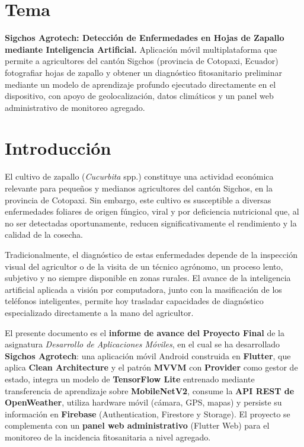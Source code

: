 \documentclass[12pt,a4paper]{article}
\begin{document}
\newpage
{}
\setcounter{page}{1}

\section*{Tema}

\textbf{Sigchos Agrotech: Detección de Enfermedades en Hojas de Zapallo mediante
Inteligencia Artificial.} Aplicación móvil multiplataforma que permite a
agricultores del cantón Sigchos (provincia de Cotopaxi, Ecuador) fotografiar
hojas de zapallo y obtener un diagnóstico fitosanitario preliminar mediante un
modelo de aprendizaje profundo ejecutado directamente en el dispositivo, con
apoyo de geolocalización, datos climáticos y un panel web administrativo de
monitoreo agregado.

\section{Introducción}

El cultivo de zapallo (\textit{Cucurbita} spp.) constituye una actividad
económica relevante para pequeños y medianos agricultores del cantón Sigchos,
en la provincia de Cotopaxi. Sin embargo, este cultivo es susceptible a diversas
enfermedades foliares de origen fúngico, viral y por deficiencia nutricional que,
al no ser detectadas oportunamente, reducen significativamente el rendimiento y
la calidad de la cosecha.

Tradicionalmente, el diagnóstico de estas enfermedades depende de la
inspección visual del agricultor o de la visita de un técnico agrónomo, un
proceso lento, subjetivo y no siempre disponible en zonas rurales. El avance de
la inteligencia artificial aplicada a visión por computadora, junto con la
masificación de los teléfonos inteligentes, permite hoy trasladar capacidades
de diagnóstico especializado directamente a la mano del agricultor.

El presente documento es el \textbf{informe de avance del Proyecto Final} de la
asignatura \textit{Desarrollo de Aplicaciones Móviles}, en el cual se ha
desarrollado \textbf{Sigchos Agrotech}: una aplicación móvil Android construida
en \textbf{Flutter}, que aplica \textbf{Clean Architecture} y el patrón
\textbf{MVVM} con \textbf{Provider} como gestor de estado, integra un modelo de
\textbf{TensorFlow Lite} entrenado mediante transferencia de aprendizaje sobre
\textbf{MobileNetV2}, consume la \textbf{API REST de OpenWeather}, utiliza
hardware móvil (cámara, GPS, mapas) y persiste su información en
\textbf{Firebase} (Authentication, Firestore y Storage). El proyecto se
complementa con un \textbf{panel web administrativo} (Flutter Web) para el
monitoreo de la incidencia fitosanitaria a nivel agregado.
\end{document}
